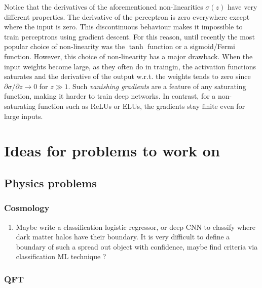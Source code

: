Notice that the derivatives of the aforementioned non-linearities $\sigma(z)$ have very different properties. The derivative of the perceptron is zero everywhere except where the input is zero. This discontinuous behaviour makes it impossible to train perceptrons using gradient descent. For this reason, until recently the most popular choice of non-linearity was the $\tanh$ function or a sigmoid/Fermi function. However, this choice of non-linearity has a major drawback. When the input weights become large, as they often do in traingin, the activation functions saturates and the derivative of the output w.r.t. the weights tends to zero since $\partial \sigma /\partial z \rightarrow 0$ for $z\gg 1$. Such \emph{vanishing gradients} are a feature of any saturating function, making it harder to train deep networks. In contrast, for a non-saturating function such as ReLUs or ELUs, the gradients stay finite even for large inputs.
































\chapter{Ideas for problems to work on}
\section{Physics problems}
\subsection{Cosmology}
\begin{enumerate}
	\item Maybe write a classification logistic regressor, or deep CNN to classify where dark matter halos have their boundary. It is very difficult to define a boundary of such a spread out object with confidence, maybe find criteria via classification ML technique ?
\end{enumerate}
\subsection{QFT}
